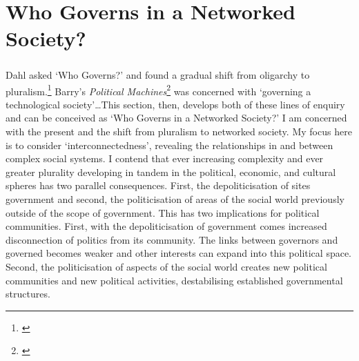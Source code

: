 \documentclass[11pt,titlepage]{book}
\begin{document}
\chapter{Who Governs in a Networked Society?}
\paragraph{}Dahl asked `Who Governs?' and found a gradual shift from oligarchy to pluralism.\footnote{\cite{Dahl:1961fj}} Barry's \emph{Political Machines}\footnote{\cite{Barry:2001ff}} was concerned with `governing a technological society'\ldots This section, then, develops both of these lines of enquiry and can be conceived as `Who Governs in a Networked Society?' I am concerned with the present and the shift from pluralism to networked society. My focus here is to consider `interconnectedness', revealing the relationships in and between complex social systems. I contend that ever increasing complexity and ever greater plurality developing in tandem in the political, economic, and cultural spheres has two parallel consequences. First, the depoliticisation of sites government and second, the politicisation of areas of the social world previously outside of the scope of government. This has two implications for political communities. First, with the depoliticisation of government comes increased disconnection of politics from its community. The links between governors and governed becomes weaker and other interests can expand into this political space. Second, the politicisation of aspects of the social world creates new political communities and new political activities, destabilising established governmental structures.
\end{document}
